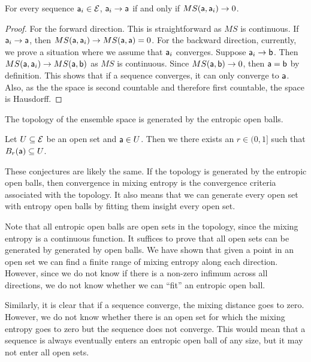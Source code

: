 \begin{conj}
	For every sequence $\ens[a]_i \in \Ens$, $\ens[a]_i \to \ens[a]$ if and only if $MS(\ens[a], \ens[a]_i) \to 0$.
\end{conj}

\begin{proof}
	For the forward direction. This is straightforward as $MS$ is continuous. If $\ens[a]_i \to \ens[a]$, then $MS(\ens[a], \ens[a]_i) \to MS(\ens[a], \ens[a]) = 0$. For the backward direction, currently, we prove a situation where we assume that $\ens[a]_i$ converges. Suppose $\ens[a]_i \to \ens[b]$. Then $MS(\ens[a], \ens[a]_i) \to MS(\ens[a], \ens[b])$ as $MS$ is continuous. Since $MS(\ens[a], \ens[b]) \to 0$, then $\ens[a]=\ens[b]$ by definition. This shows that if a sequence converges, it can only converge to $\ens[a]$. Also, as the the space is second countable and therefore first countable, the space is Hausdorff.
\end{proof}

\begin{conj}
	The topology of the ensemble space is generated by the entropic open balls.
\end{conj}

\begin{conj}
	Let $U \subseteq \Ens$ be an open set and $\ens[a] \in U$. Then we there exists an $r \in (0,1]$ such that $B_r(\ens[a]) \subseteq U$.
\end{conj}

\begin{remark}
	These conjectures are likely the same. If the topology is generated by the entropic open balls, then convergence in mixing entropy is the convergence criteria associated with the topology. It also means that we can generate every open set with entropy open balls by fitting them insight every open set.
	
	Note that all entropic open balls are open sets in the topology, since the mixing entropy is a continuous function. It suffices to prove that all open sets can be generated by generated by open balls. We have shown that given a point in an open set we can find a finite range of mixing entropy along each direction. However, since we do not know if there is a non-zero infimum across all directions, we do not know whether we can ``fit'' an entropic open ball.
	
	Similarly, it is clear that if a sequence converge, the mixing distance goes to zero. However, we do not know whether there is an open set for which the mixing entropy goes to zero but the sequence does not converge. This would mean that a sequence is always eventually enters an entropic open ball of any size, but it may not enter all open sets.
\end{remark}

